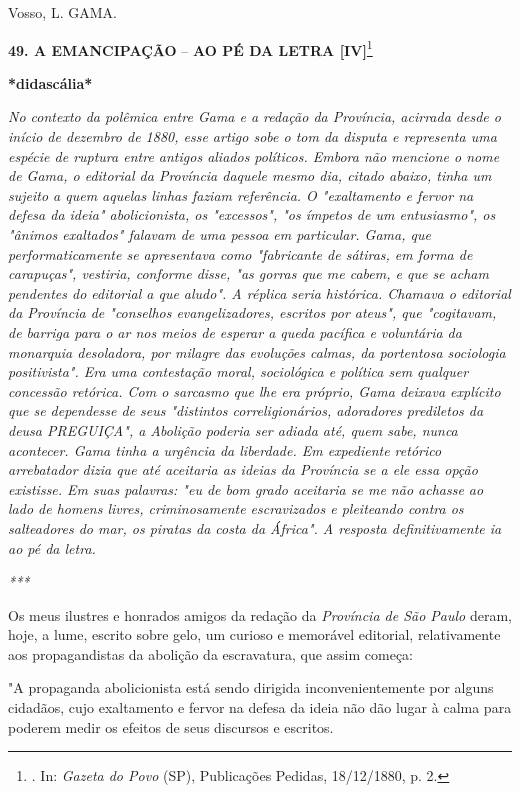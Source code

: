 Vosso, L. GAMA.

\textbf{49. A EMANCIPAÇÃO} -- \textbf{AO PÉ DA LETRA {[}IV{]}}\footnote{.
  In: \emph{Gazeta do Povo} (SP), Publicações Pedidas, 18/12/1880, p. 2.}

\textbf{*didascália*}

\emph{No contexto da polêmica entre Gama e a redação da Província,
acirrada desde o início de dezembro de 1880, esse artigo sobe o tom da
disputa e representa uma espécie de ruptura entre antigos aliados
políticos. Embora não mencione o nome de Gama, o editorial da Província
daquele mesmo dia, citado abaixo, tinha um sujeito a quem aquelas linhas
faziam referência. O "exaltamento e fervor na defesa da ideia"
abolicionista, os "excessos", "os ímpetos de um entusiasmo", os "ânimos
exaltados" falavam de uma pessoa em particular. Gama, que
performaticamente se apresentava como "fabricante de sátiras, em forma
de carapuças", vestiria, conforme disse, "as gorras que me cabem, e que
se acham pendentes do editorial a que aludo". A réplica seria histórica.
Chamava o editorial da Província de "conselhos evangelizadores, escritos
por ateus", que "cogitavam, de barriga para o ar nos meios de esperar a
queda pacífica e voluntária da monarquia desoladora, por milagre das
evoluções calmas, da portentosa sociologia positivista". Era uma
contestação moral, sociológica e política sem qualquer concessão
retórica. Com o sarcasmo que lhe era próprio, Gama deixava explícito que
se dependesse de seus "distintos correligionários, adoradores prediletos
da deusa PREGUIÇA", a Abolição poderia ser adiada até, quem sabe, nunca
acontecer. Gama tinha a urgência da liberdade. Em expediente retórico
arrebatador dizia que até aceitaria as ideias da Província se a ele essa
opção existisse. Em suas palavras: "eu de bom grado aceitaria se me não
achasse ao lado de homens livres, criminosamente escravizados e
pleiteando contra os salteadores do mar, os piratas da costa da África".
A resposta definitivamente ia ao pé da letra. }

\emph{***}

Os meus ilustres e honrados amigos da redação da \emph{Província de São
Paulo} deram, hoje, a lume, escrito sobre gelo, um curioso e memorável
editorial, relativamente aos propagandistas da abolição da escravatura,
que assim começa:

"A propaganda abolicionista está sendo dirigida inconvenientemente por
alguns cidadãos, cujo exaltamento e fervor na defesa da ideia não dão
lugar à calma para poderem medir os efeitos de seus discursos e
escritos.

